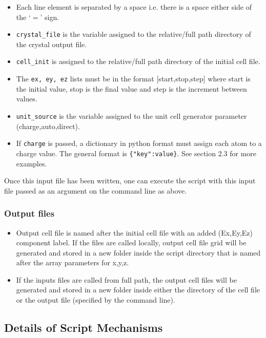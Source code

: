 \begin{itemize}
	\item Each line element is separated by a space i.e. there is a space either side of the `$=$' sign.
	\item \texttt{crystal\_file} is the variable assigned to the relative/full path directory of the crystal output file.
	\item \texttt{cell\_init} is assigned to the relative/full path directory of the initial cell file.
	\item The \texttt{ex, ey, ez} lists must be in the format [start,stop,step] where start is the initial value, stop is the final value and step is the increment between values.
	\item \texttt{unit\_source} is the variable assigned to the unit cell generator parameter (charge,auto,direct).
	\item If \texttt{charge} is passed, a dictionary in python format must assign each atom to a charge value. The general format is \texttt{\{"key":value\}}. See section 2.3 for more examples.
	
\end{itemize}

Once this input file has been written, one can execute the script with this input file passed as an argument on the command line as above. 

\subsubsection{Output files}

\begin{itemize}
	\item Output cell file is named after the initial cell file with an added (Ex,Ey,Ez) component label. If the files are called locally, output cell file grid will be generated and stored in a new folder inside the script directory that is named after the array parameters for x,y,z.
	\item If the inputs files are called from full path, the output cell files will be generated and stored in a new folder inside either the directory of the cell file or the output file (specified by the command line).
\end{itemize}

\subsection{Details of Script Mechanisms}


